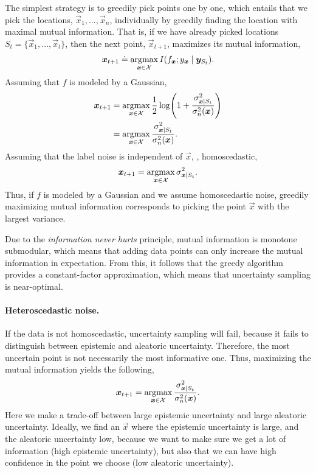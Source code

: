 The simplest strategy is to greedily pick points one by one, which entails
that we pick the locations, $\vec{x}_1,\ldots,\vec{x}_n$, individually by
greedily finding the location with maximal mutual information. That is, if we
have already picked locations $S_t = \{ \vec{x}_1,\ldots,\vec{x}_t \}$, then
the next point, $\vec{x}_{t+1}$, maximizes its mutual information, \[
  \bm{x}_{t+1} \doteq \operatorname*{argmax}_{\bm{x}\in\mathcal{X}} I(f_{\bm{x}};y_{\bm{x}}\mid\bm{y}_{S_t})
.\]
Assuming that $f$ is modeled by a Gaussian,
\begin{align*}
  \vec{x}_{t+1} &= \argmax_{\vec{x}\in\mathcal{X}} \frac{1}{2}\log\lft( 1+\frac{\sigma_{\vec{x}\mid S_t}^2}{\sigma_n^2(\vec{x})} \rgt) \\
  &= \argmax_{\vec{x}\in\X} \frac{\sigma^2_{\vec{x}\mid S_t}}{\sigma_n^2(\vec{x})}
.\end{align*}
Assuming that the label noise is independent of $\vec{x}$, \ie, homoscedastic,
\[
  \bm{x}_{t+1} = \operatorname*{argmax}_{\bm{x}\in\mathcal{X}} \sigma_{\bm{x}\mid S_t}^2
.\]
Thus, if $f$ is modeled by a Gaussian and we assume homoscedastic noise,
greedily maximizing mutual information corresponds to picking the point
$\vec{x}$ with the largest variance.

Due to the \textit{information never hurts} principle, mutual information is
monotone submodular, which means that adding data points can only increase
the mutual information in expectation. From this, it follows that the greedy
algorithm provides a constant-factor approximation, which means that
uncertainty sampling is near-optimal.

\paragraph{Heteroscedastic noise.}

If the data is not homoscedastic, uncertainty sampling will fail, because it
fails to distinguish between epistemic and aleatoric uncertainty. Therefore,
the most uncertain point is not necessarily the most informative one. Thus,
maximizing the mutual information yields the following, \[
  \bm{x}_{t+1} = \operatorname*{argmax}_{\bm{x}\in\mathcal{X}} \frac{\sigma_{\bm{x}\mid S_t}^2}{\sigma_n^2(\bm{x})}
.\]
Here we make a trade-off between large epistemic uncertainty and large
aleatoric uncertainty. Ideally, we find an $\vec{x}$ where the epistemic
uncertainty is large, and the aleatoric uncertainty low, because we want to
make sure we get a lot of information (high epistemic uncertainty), but also
that we can have high confidence in the point we choose (low aleatoric
uncertainty).

